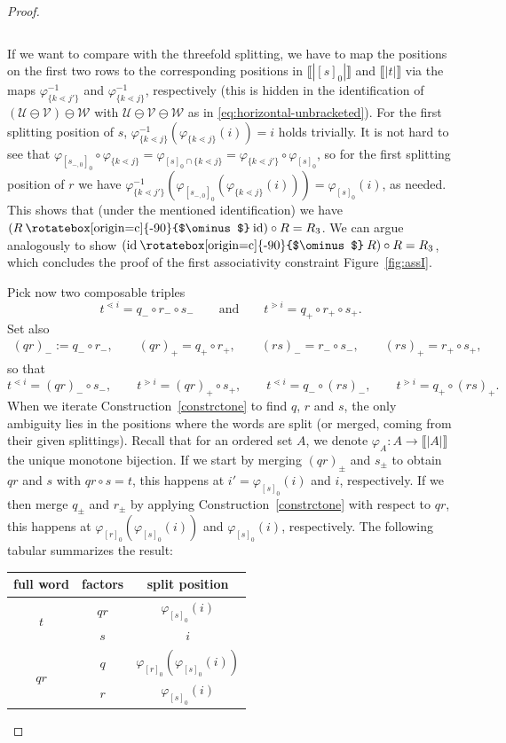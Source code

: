 \documentclass[pdftex]{sigma}
\newcommand\overt{\mathbin{\text{\rotatebox[origin=c]{-90}{$\ominus$}}}}
\newcommand{\interval}[1]{\llbracket #1 \rrbracket}
\newcommand{\stdl}{\lessdot}
\newcommand{\stdg}{\gtrdot}
\numberwithin{equation}{section}
\begin{document}
\begin{proof}
\begin{center}
\begin{tabular}{|c|c|c|}
 \end{tabular}
 \end{center}
 If we want to compare with the threefold splitting, we have to map the positions on the first two rows to the corresponding positions in $\interval{|[s]_0|}$ and $\interval{|t|}$ via the maps $\varphi_{\{k\stdl j'\}}^{-1}$ and $\varphi_{\{k\stdl j\}}^{-1}$, respectively (this is hidden in the identification of $(\mathcal U\ominus \mathcal V)\ominus \mathcal W$ with $\mathcal U\ominus \mathcal V\ominus \mathcal W$ as in \eqref{eq:horizontal-unbracketed}). For the first splitting position of $s$, $\varphi_{\{k\stdl j\}}^{-1}(\varphi_{\{k\stdl j\}}(i))=i$ holds trivially. It is not hard to see that $\varphi_{[s_{-,0}]_0}\circ\varphi_{\{k\stdl j\}}=\varphi_{[s]_0\cap\{k\stdl j\}}=\varphi_{\{k\stdl j'\}}\circ\varphi_{[s]_0}$, so for the first splitting position of $r$ we have $\varphi_{\{k\stdl j'\}}^{-1}(\varphi_{[s_{-,0}]_0}(\varphi_{\{k\stdl j\}}(i)))=\varphi_{[s]_0}(i)$, as needed. This shows that (under the mentioned identification) we have $(R\overt \mathrm{id})\circ R=R_3$. We can argue analogously to show $(\mathrm{id}\overt R)\circ R=R_3$, which concludes the proof of the first associativity constraint Figure~\ref{fig:assI}.

 Pick now two composable triples
 \[
 t^{\stdl i}=q_- \circ r_- \circ s_- \qquad \text{and}\qquad t^{\stdg i}=q_+ \circ r_+ \circ s_+.
 \]
 Set also
 \begin{align*}
 (qr)_{-} := q_- \circ r_-,\qquad (qr)_{+} = q_+ \circ r_+,\qquad
 	(rs)_{-} = r_{-}\circ s_{-},\qquad (rs)_{+} = r_+ \circ s_+,
 \end{align*}
 so that
 \[
 t^{\stdl i} = (qr)_{-} \circ s_-,\qquad t^{\stdg i} = (qr)_{+} \circ s_+,\qquad
 t^{\stdl i} = q_-\circ (rs)_-, \qquad t^{\stdg i} = q_+ \circ (rs)_+.
 \]
 When we iterate Construction~\ref{constrctone} to find $q$, $r$ and $s$, the only ambiguity lies in the positions where the words are split (or merged, coming from their given splittings). Recall that for an ordered set $A$, we denote $\varphi_A\colon A\to \interval{|A|}$ the unique monotone bijection. If we start by merging $(qr)_{\pm}$ and $s_{\pm}$ to obtain $qr$ and $s$ with $qr\circ s=t$, this happens at $i'=\varphi_{[s]_0}(i)$ and $i$, respectively. If we then merge $q_{\pm}$ and $r_{\pm}$ by applying Construction~\ref{constrctone} with respect to $qr$, this happens at $\varphi_{[r]_0}(\varphi_{[s]_0}(i))$ and $\varphi_{[s]_0}(i)$, respectively. The following tabular summarizes the result:
 \begin{center}
 \begin{tabular}{|c|c|c|}\hline
 full word& factors & split position\\\hline\hline
 \multirow{2}{*}{$t$}&$qr$&$\varphi_{[s]_0}(i)$\\\cline{2-3}
 &$s$&$i$\\\hline\hline
 \multirow{2}{*}{$qr$}&$q$&$\varphi_{[r]_0}(\varphi_{[s]_0}(i))$\\\cline{2-3}
 &$r$&$\varphi_{[s]_0}(i)$\\\hline


\end{tabular}
\end{center}
\end{proof}
\end{document}
